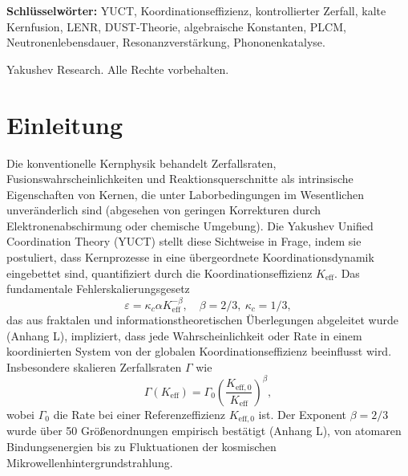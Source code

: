 \documentclass[12pt]{article}
\theoremstyle{remark}
\newcommand{\Keff}{K_{\mathrm{eff}}}
\newcommand{\Keffzero}{K_{\mathrm{eff},0}}
\begin{document}
\begin{titlepage}
\begin{center}
			\vspace{0.3cm}
			
			\noindent
			\small\textbf{Schlüsselwörter:} YUCT, Koordinationseffizienz, kontrollierter Zerfall, kalte Kernfusion, LENR, DUST-Theorie, algebraische Konstanten, PLCM, Neutronenlebensdauer, Resonanzverstärkung, Phononenkatalyse.
			
			\vspace{0.1cm}
			
			\noindent
			 Yakushev Research. Alle Rechte vorbehalten.
		\end{center}
	\end{titlepage}
	
	\tableofcontents
	\newpage
	
	\section{Einleitung}
	\label{sec:intro}
	
	Die konventionelle Kernphysik behandelt Zerfallsraten, Fusionswahrscheinlichkeiten und Reaktionsquerschnitte als intrinsische Eigenschaften von Kernen, die unter Laborbedingungen im Wesentlichen unveränderlich sind (abgesehen von geringen Korrekturen durch Elektronenabschirmung oder chemische Umgebung). Die Yakushev Unified Coordination Theory (YUCT) stellt diese Sichtweise in Frage, indem sie postuliert, dass Kernprozesse in eine übergeordnete Koordinationsdynamik eingebettet sind, quantifiziert durch die Koordinationseffizienz \(\Keff\). Das fundamentale Fehlerskalierungsgesetz
	\begin{equation}
		\varepsilon = \kappa_c \alpha \Keff^{-\beta}, \quad \beta = 2/3,\ \kappa_c = 1/3,
		\label{eq:universal-scaling}
	\end{equation}
	das aus fraktalen und informationstheoretischen Überlegungen abgeleitet wurde (Anhang L), impliziert, dass jede Wahrscheinlichkeit oder Rate in einem koordinierten System von der globalen Koordinationseffizienz beeinflusst wird. Insbesondere skalieren Zerfallsraten \(\Gamma\) wie
	\begin{equation}
		\Gamma(\Keff) = \Gamma_0 \left( \frac{\Keffzero}{\Keff} \right)^{\beta},
		\label{eq:decay-rate}
	\end{equation}
	wobei \(\Gamma_0\) die Rate bei einer Referenzeffizienz \(\Keffzero\) ist. Der Exponent \(\beta = 2/3\) wurde über 50 Größenordnungen empirisch bestätigt (Anhang L), von atomaren Bindungsenergien bis zu Fluktuationen der kosmischen Mikrowellenhintergrundstrahlung.
	
\end{document}
